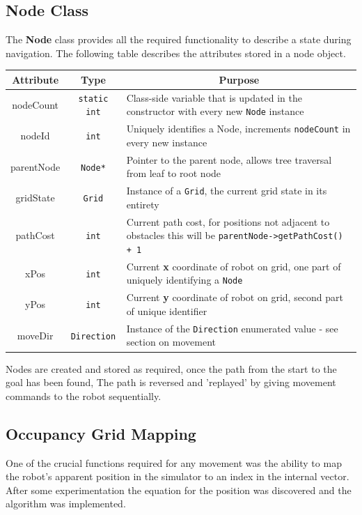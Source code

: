 \documentclass[a4paper,12pt]{article}
\begin{document}
\subsection{Node Class}
The \textbf{Node} class provides all the required functionality to describe a state during navigation. The following table describes the attributes stored in a node object.
\begin{table}
\centering
\scriptsize
\begin{tabular}{|c|c|l|}
    \hline
    \multicolumn{1}{|c|}{\textbf{Attribute}} & \multicolumn{1}{c|}{\textbf{Type}} & \multicolumn{1}{c|}{\textbf{Purpose}} \\
    \hline
    nodeCount & \texttt{static int} & Class-side variable that is updated in the constructor with every new \texttt{Node} instance\\
    \hline
    nodeId & \texttt{int} & Uniquely identifies a Node, increments \texttt{nodeCount} in every new instance\\
    \hline
    parentNode & \texttt{Node*} & Pointer to the parent node, allows tree traversal from leaf to root node \\
    \hline
    gridState & \texttt{Grid} & Instance of a \texttt{Grid},  the current grid state in its entirety\\
    \hline
    pathCost & \texttt{int} & Current path cost, for positions not adjacent to obstacles this will be \texttt{parentNode->getPathCost() + 1} \\
    \hline
    xPos & \texttt{int} & Current \textbf{x} coordinate of robot on grid, one part of uniquely identifying a \texttt{Node} \\
    \hline
    yPos & \texttt{int} & Current \textbf{y} coordinate of robot on grid, second part of unique identifier\\
    \hline
    moveDir & \texttt{Direction} & Instance of the \texttt{Direction} enumerated value - see section on movement\\
    \hline
\end{tabular}
\end{table}
\normalsize
Nodes are created and stored as required, once the path from the start to the goal has been found, The path is reversed and 'replayed' by giving movement commands to the robot sequentially.
\subsection{Occupancy Grid Mapping}
One of the crucial functions required for any movement was the ability to map the robot's apparent position in the simulator to an index in the internal vector. After some experimentation the equation for the position was discovered and the algorithm was implemented. 
\end{document}
